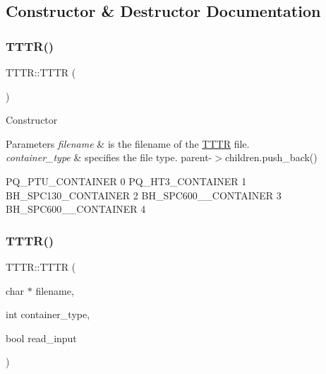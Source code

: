 \subsection{Constructor \& Destructor Documentation}
\mbox{\label{class_t_t_t_r_ad5537ce07845c94629ca3b88008a7597}} 
\subsubsection{\texorpdfstring{T\+T\+T\+R()}{TTTR()}\hspace{0.1cm}{\footnotesize\ttfamily [1/6]}}
{\footnotesize\ttfamily T\+T\+T\+R\+::\+T\+T\+TR (\begin{DoxyParamCaption}{ }\end{DoxyParamCaption})}

Constructor 
\begin{DoxyParams}{Parameters}
{\em filename} & is the filename of the \hyperlink{class_t_t_t_r}{T\+T\+TR} file. \\
\hline
{\em container\+\_\+type} & specifies the file type. parent-\/$>$children.\+push\+\_\+back()\\
\hline
\end{DoxyParams}
P\+Q\+\_\+\+P\+T\+U\+\_\+\+C\+O\+N\+T\+A\+I\+N\+ER 0 P\+Q\+\_\+\+H\+T3\+\_\+\+C\+O\+N\+T\+A\+I\+N\+ER 1 B\+H\+\_\+\+S\+P\+C130\+\_\+\+C\+O\+N\+T\+A\+I\+N\+ER 2 B\+H\+\_\+\+S\+P\+C600\+\_\+\_\+\+C\+O\+N\+T\+A\+I\+N\+ER 3 B\+H\+\_\+\+S\+P\+C600\+\_\+\_\+\+C\+O\+N\+T\+A\+I\+N\+ER 4 \mbox{\label{class_t_t_t_r_af6cb99fa270ec32d7cd73211eb9a25eb}} 
\subsubsection{\texorpdfstring{T\+T\+T\+R()}{TTTR()}\hspace{0.1cm}{\footnotesize\ttfamily [2/6]}}
{\footnotesize\ttfamily T\+T\+T\+R\+::\+T\+T\+TR (\begin{DoxyParamCaption}\item[{char $\ast$}]{filename,  }\item[{int}]{container\+\_\+type,  }\item[{bool}]{read\+\_\+input }\end{DoxyParamCaption})}

